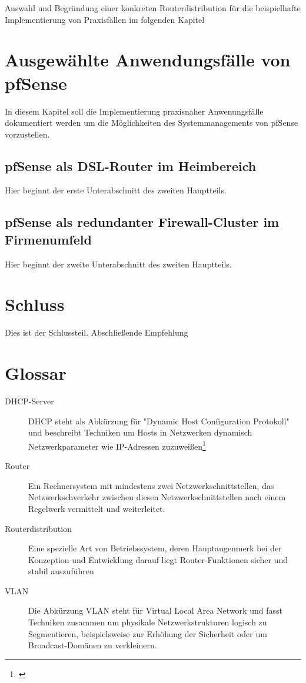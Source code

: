 \documentclass[a4paper,12pt]{scrartcl}
\begin{document}
Auswahl und Begr\"undung einer konkreten Routerdistribution f\"ur die
beispielhafte Implementierung von Praxisf\"allen im folgenden Kapitel

\section{Ausgew\"ahlte Anwendungsf\"alle von pfSense}
In diesem Kapitel soll die Implementierung praxisnaher Anwenungsf\"alle
dokumentiert werden um die M\"oglichkeiten des Systemmanagements von pfSense
vorzustellen. 

\subsection{pfSense als DSL-Router im Heimbereich}
Hier beginnt der erste Unterabschnitt des zweiten Hauptteils.

\subsection{pfSense als redundanter Firewall-Cluster im Firmenumfeld}
Hier beginnt der zweite Unterabschnitt des zweiten Hauptteils.


\section{Schluss}
Dies ist der Schlussteil. Abschlie\ss{}ende Empfehlung
\clearpage

\section{Glossar}
\begin{description}
 \item[DHCP-Server] DHCP steht als Abk\"urzung f\"ur "Dynamic Host
Configuration Protokoll" und beschreibt Techniken um Hosts in Netzwerken
dynamisch Netzwerkparameter wie IP-Adressen zuzuwei\ss{}en\footnote{\cite{dhcp}}
 \item[Router] Ein Rechnersystem mit mindestens zwei Netzwerkschnittstellen,
das Netzwerkschverkehr zwischen diesen Netzwerkschnittstellen nach einem
Regelwerk vermittelt und weiterleitet.
 \item[Routerdistribution] Eine spezielle Art von Betriebssystem, deren
Hauptaugenmerk bei der Konzeption und Entwicklung darauf liegt
Router-Funktionen sicher und stabil auszuf\"uhren
 \item[VLAN] Die Abk\"urzung VLAN steht f\"ur Virtual Local Area Network und
fasst Techniken zusammen um physikale Netzwerkstrukturen logisch zu
Segmentieren, beispielsweise zur Erh\"ohung der Sicherheit oder um
Broadcast-Dom\"anen zu verkleinern.
\end{description}
\clearpage
\end{document}
